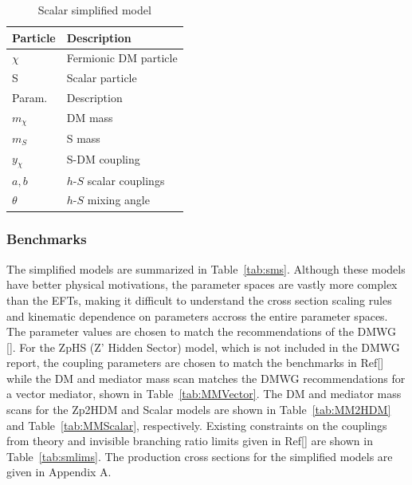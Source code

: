 \begin{table}[htbH]
\begin{center}
\begin{tabular}{ l | l}
\hline
Particle & Description \\
\hline
$\chi$ & Fermionic DM particle \\
S & Scalar particle \\
\hline
Param. & Description \\
\hline
$m_\chi$ & DM mass \\
$m_{S}$ & S mass \\
$y_\chi$ & S-DM coupling \\
$a, b$ & $h$-$S$ scalar couplings \\
$\theta$ & $h$-$S$ mixing angle \\
\hline
\end{tabular}
\caption{Scalar simplified model}\label{tab:Scalar}
\end{center}
\end{table}


\subsubsection{Benchmarks}

The simplified models are summarized in Table~\ref{tab:sms}. Although these models have better physical motivations, the parameter spaces are vastly more complex than the EFTs, making it difficult to understand the cross section scaling rules and kinematic dependence on parameters accross the entire parameter spaces. The parameter values are chosen to match the recommendations of the DMWG []. For the ZpHS (Z' Hidden Sector) model, which is not included in the DMWG report, the coupling parameters are chosen to match the benchmarks in Ref[] while the DM and mediator mass scan matches the DMWG recommendations for a vector mediator, shown in Table~\ref{tab:MMVector}. The DM and mediator mass scans for the Zp2HDM and Scalar models are shown in Table~\ref{tab:MM2HDM} and Table~\ref{tab:MMScalar}, respectively. Existing constraints on the couplings from theory and invisible branching ratio limits given in Ref[] are shown in Table~\ref{tab:smlims}. The production cross sections for the simplified models are given in Appendix A. 

